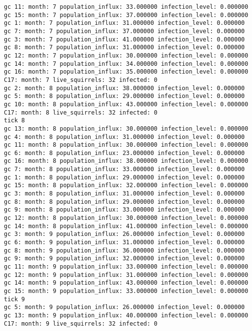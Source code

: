 \begin{lstlisting}[basicstyle=\tiny]
gc 11: month: 7 population_influx: 33.000000 infection_level: 0.000000
gc 15: month: 7 population_influx: 37.000000 infection_level: 0.000000
gc 1: month: 7 population_influx: 31.000000 infection_level: 0.000000
gc 7: month: 7 population_influx: 37.000000 infection_level: 0.000000
gc 3: month: 7 population_influx: 41.000000 infection_level: 0.000000
gc 8: month: 7 population_influx: 31.000000 infection_level: 0.000000
gc 12: month: 7 population_influx: 30.000000 infection_level: 0.000000
gc 14: month: 7 population_influx: 34.000000 infection_level: 0.000000
gc 16: month: 7 population_influx: 35.000000 infection_level: 0.000000
C17: month: 7 live_squirrels: 32 infected: 0
gc 2: month: 8 population_influx: 38.000000 infection_level: 0.000000
gc 5: month: 8 population_influx: 29.000000 infection_level: 0.000000
gc 10: month: 8 population_influx: 43.000000 infection_level: 0.000000
C17: month: 8 live_squirrels: 32 infected: 0
tick 8
gc 13: month: 8 population_influx: 30.000000 infection_level: 0.000000
gc 4: month: 8 population_influx: 31.000000 infection_level: 0.000000
gc 11: month: 8 population_influx: 30.000000 infection_level: 0.000000
gc 6: month: 8 population_influx: 23.000000 infection_level: 0.000000
gc 16: month: 8 population_influx: 38.000000 infection_level: 0.000000
gc 7: month: 8 population_influx: 33.000000 infection_level: 0.000000
gc 1: month: 8 population_influx: 29.000000 infection_level: 0.000000
gc 15: month: 8 population_influx: 32.000000 infection_level: 0.000000
gc 3: month: 8 population_influx: 31.000000 infection_level: 0.000000
gc 8: month: 8 population_influx: 29.000000 infection_level: 0.000000
gc 9: month: 8 population_influx: 33.000000 infection_level: 0.000000
gc 12: month: 8 population_influx: 30.000000 infection_level: 0.000000
gc 14: month: 8 population_influx: 41.000000 infection_level: 0.000000
gc 3: month: 9 population_influx: 26.000000 infection_level: 0.000000
gc 6: month: 9 population_influx: 31.000000 infection_level: 0.000000
gc 8: month: 9 population_influx: 36.000000 infection_level: 0.000000
gc 9: month: 9 population_influx: 32.000000 infection_level: 0.000000
gc 11: month: 9 population_influx: 33.000000 infection_level: 0.000000
gc 12: month: 9 population_influx: 31.000000 infection_level: 0.000000
gc 14: month: 9 population_influx: 43.000000 infection_level: 0.000000
gc 15: month: 9 population_influx: 33.000000 infection_level: 0.000000
tick 9
gc 5: month: 9 population_influx: 26.000000 infection_level: 0.000000
gc 13: month: 9 population_influx: 40.000000 infection_level: 0.000000
C17: month: 9 live_squirrels: 32 infected: 0

\end{lstlisting}
